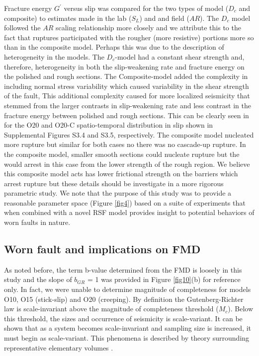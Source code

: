 \documentclass[preprint,1p, 10pt,authoryear]{elsarticle}
\begin{document}
Fracture energy $G^{'}$ versus slip was compared for the two types of model ($D_{c}$ and composite) to estimates made  in the lab ($S_{L}$) and and field ($AR$). The $D_{c}$ model followed the $AR$ scaling relationship more closely and we attribute this to the fact that ruptures participated with the rougher (more resistive) portions more so than in the composite model.  Perhaps this was due to the description of heterogeneity in the models. The $D_{c}$-model had a constant shear strength and, therefore, heterogeneity in both the slip-weakening rate and fracture energy on the polished and rough sections. The Composite-model added the complexity in including normal stress variability which caused variability in the shear strength of the fault, This additional complexity caused for more localized seismicity that stemmed from the larger contrasts in slip-weakening rate and less contrast in the fracture energy between polished and rough sections. This can be clearly seen in for the O20 and O20-C spatio-temporal distribution in slip shown in Supplemental Figures S3.4 and S3.5, respectively.  The composite model nucleated more rupture but similar for both cases no there was no cascade-up rupture.  In the composite model, smaller smooth sections could nucleate rupture but the would arrest in this case from the lower strength of the rough region.  We believe this composite model acts has lower frictional strength on the barriers which arrest rupture \citep{Page2005} but these details should be investigate in a more rigorous parametric study.  We note that the purpose of this study was to provide a reasonable parameter space (Figure \ref{fig4}) based on a suite of experiments that when combined with a novel RSF model provides insight to potential behaviors of worn faults in nature.

\subsection{Worn fault and implications on FMD}
As noted before, the term b-value determined from the FMD is loosely in this study and the slope of $b_{GR}$ = 1 was provided in Figure \ref{fig10}(b) for reference only. In fact, we were unable to determine magnitude of completeness for models O10, O15 (stick-slip) and O20 (creeping). By definition the Gutenberg-Richter law is scale-invariant above the magnitude of completeness threshold ($M_{c}$). Below this threshold, the sizes and occurrence of seismicity is scale-variant. It can be shown that as a system becomes scale-invariant and sampling size is increased, it must begin as scale-variant. This phenomena is described by theory surrounding representative elementary volumes \citep{Hill1963}.
\end{document}
